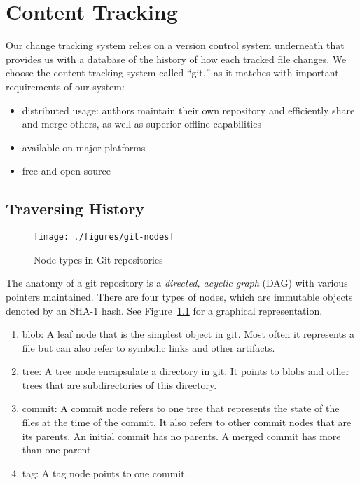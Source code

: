 	\newcommand{\figscale}{0.6}
\chapter{Content Tracking}
\minitoc

Our change tracking system relies on a version control system underneath that provides us with a database of the history of how each tracked file changes.  We choose the content tracking system called ``git,'' \cite{git} as it matches with important requirements of our system:
\begin{itemize}
\item distributed usage: authors maintain their own repository and efficiently share and merge others, as well as superior offline capabilities
\item available on major platforms %
\item free and open source
\end{itemize}

\section{Traversing History}

\begin{figure}
\centering
\texttt{[image: ./figures/git-nodes]}
\caption{Node types in Git repositories} \label{fig:git-nodes}
\end{figure}
The anatomy of a git repository is a \textit{directed, acyclic graph} (DAG) with various pointers maintained. There are four types of nodes, which are immutable objects denoted by an SHA-1 hash.  See Figure~\ref{fig:git-nodes} for a graphical representation. 
\begin{enumerate}
\item blob: A leaf node that is the simplest object in git.  Most often it represents a file but can also refer to symbolic links and other artifacts.
\item tree: A tree node encapsulate a directory in git.  It points to blobs and other trees that are subdirectories of this directory.
\item commit: A commit node refers to one tree that represents the state of the files at the time of the commit.  It also refers to other commit nodes that are its parents.  An initial commit has no parents.  A merged commit has more than one parent.
\item tag: A tag node points to one commit.
\end{enumerate}

